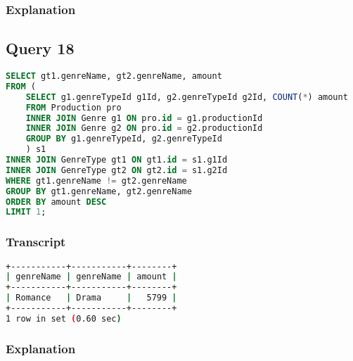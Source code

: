 \subsubsection{Explanation}


\subsection{Query 18}
\begin{lstlisting}[language=sql]
SELECT gt1.genreName, gt2.genreName, amount
FROM (
	SELECT g1.genreTypeId g1Id, g2.genreTypeId g2Id, COUNT(*) amount
	FROM Production pro
	INNER JOIN Genre g1 ON pro.id = g1.productionId
	INNER JOIN Genre g2 ON pro.id = g2.productionId
	GROUP BY g1.genreTypeId, g2.genreTypeId
	) s1
INNER JOIN GenreType gt1 ON gt1.id = s1.g1Id
INNER JOIN GenreType gt2 ON gt2.id = s1.g2Id
WHERE gt1.genreName != gt2.genreName
GROUP BY gt1.genreName, gt2.genreName
ORDER BY amount DESC
LIMIT 1;
\end{lstlisting}

\subsubsection{Transcript}
\begin{lstlisting}[language=bash]
+-----------+-----------+--------+
| genreName | genreName | amount |
+-----------+-----------+--------+
| Romance   | Drama     |   5799 |
+-----------+-----------+--------+
1 row in set (0.60 sec)
\end{lstlisting}

\subsubsection{Explanation}